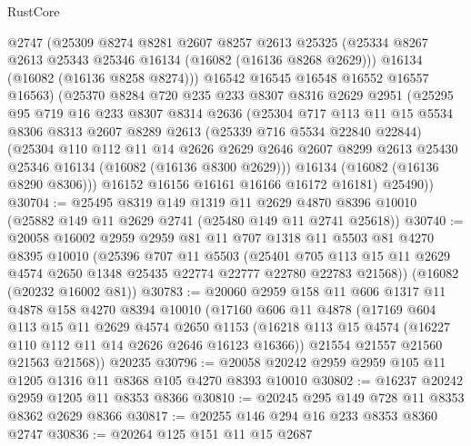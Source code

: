 \begin{lexlean}{RustCore}
\begin{coremodule}
        @2747
        (@25309
          @8274
          @8281
          @2607
          @8257
          @2613
          @25325
          (@25334 @8267 @2613 @25343 @25346 @16134 (@16082 (@16136 @8268 @2629)))
          @16134
          (@16082 (@16136 @8258 @8274)))
        @16542
        @16545
        @16548
        @16552
        @16557
        @16563)
      (@25370
        @8284
        @720
        @235
        @233
        @8307
        @8316
        @2629
        @2951
        (@25295
          @95
          @719
          @16
          @233
          @8307
          @8314
          @2636
          (@25304
            @717
            @113
            @11
            @15
            @5534
            @8306
            @8313
            @2607
            @8289
            @2613
            (@25339 @716 @5534 @22840 @22844)
            (@25304
              @110
              @112
              @11
              @14
              @2626
              @2629
              @2646
              @2607
              @8299
              @2613
              @25430
              @25346
              @16134
              (@16082 (@16136 @8300 @2629)))
            @16134
            (@16082 (@16136 @8290 @8306)))
          @16152
          @16156
          @16161
          @16166
          @16172
          @16181)
        @25490))
@30704 := @25495
    @8319
    @149
    @1319
    @11
    @2629
    @4870
    @8396
    @10010
    (@25882 @149 @11 @2629 @2741 (@25480 @149 @11 @2741 @25618))
@30740 := @20058
    @16002
    @2959
    @2959
    @81
    @11
    @707
    @1318
    @11
    @5503
    @81
    @4270
    @8395
    @10010
    (@25396
      @707
      @11
      @5503
      (@25401 @705 @113 @15 @11 @2629 @4574 @2650 @1348 @25435 @22774 @22777 @22780 @22783 @21568))
    (@16082 (@20232 @16002 @81))
@30783 := @20060
    @2959
    @158
    @11
    @606
    @1317
    @11
    @4878
    @158
    @4270
    @8394
    @10010
    (@17160
      @606
      @11
      @4878
      (@17169
        @604
        @113
        @15
        @11
        @2629
        @4574
        @2650
        @1153
        (@16218 @113 @15 @4574 (@16227 @110 @112 @11 @14 @2626 @2646 @16123 @16366))
        @21554
        @21557
        @21560
        @21563
        @21568))
    @20235
@30796 := @20058 @20242 @2959 @2959 @105 @11 @1205 @1316 @11 @8368 @105 @4270 @8393 @10010
@30802 := @16237 @20242 @2959 @1205 @11 @8353 @8366
@30810 := @20245 @295 @149 @728 @11 @8353 @8362 @2629 @8366
@30817 := @20255 @146 @294 @16 @233 @8353 @8360 @2747
@30836 := @20264
    @125
    @151
    @11
    @15
    @2687

\end{coremodule}
\end{lexlean}
